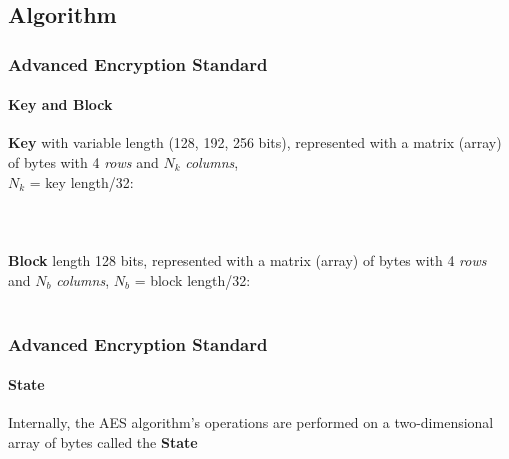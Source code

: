 \subsection{Algorithm}
\begin{frame}
	\frametitle{Advanced Encryption Standard}
		\framesubtitle{Key and Block}	
	{\normalsize
	{ \textbf{Key} with variable length (128, 192, 256 bits), represented with a matrix (array) of bytes with 4 \textit{rows}
	and $N_k$ \textit{columns},}\\ 
	{$N_k$ = key length/32:}\\
    \hspace{0.5cm}{– Key of 128 bits = 16 bytes, $N_k$ = 4}\\
    \hspace{0.5cm}{– Key of 192 bits = 24 bytes, $N_k$ = 6}\\
    \hspace{0.5cm}{– Key of 256 bits = 32 bytes, $N_k$ = 8}\\
	\vspace{0.2cm}
{\textbf{Block} length 128 bits, represented with a matrix (array) of bytes with 4 \textit{rows} and $N_b$ \textit{columns}, $N_b$ = block length/32:}\\
	\hspace{0.5cm}{– Block of 128 bits = 16 bytes, $N_b$ = 4}\\
	
	}

\end{frame}

\begin{frame}
	\frametitle{Advanced Encryption Standard}
		\framesubtitle{State}	
		{\normalsize Internally, the AES algorithm’s operations are performed on a two-dimensional array of bytes called the \textbf{State}  \\
		\hspace{0.5cm}{- Four rows, each containing Nb bytes}\\
		\hspace{0.5cm}{- Nb columns, constituted by 32-bit words}\\
		\\	
		\hspace{0.5cm}{- The array of bytes in input is copied in the State matrix}\\
		\hspace{0.5cm}{- At the end, the State matrix is copied in the output matrix}\\	
		}	
\end{frame}

